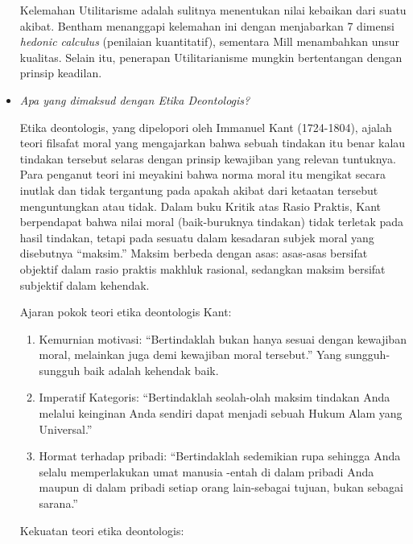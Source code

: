 \documentclass[10pt,a4paper]{article}
\def\tightlist{}
\begin{document}
\begin{multicols}{2}
\begin{itemize}
  Kelemahan Utilitarisme adalah sulitnya menentukan nilai kebaikan dari
  suatu akibat. Bentham menanggapi kelemahan ini dengan menjabarkan 7
  dimensi \emph{hedonic calculus} (penilaian kuantitatif), sementara
  Mill menambahkan unsur kualitas. Selain itu, penerapan Utilitarianisme
  mungkin bertentangan dengan prinsip keadilan.
\item
  \emph{Apa yang dimaksud dengan Etika Deontologis?}

  Etika deontologis, yang dipelopori oleh Immanuel Kant (1724-1804),
  ajalah teori filsafat moral yang mengajarkan bahwa sebuah tindakan itu
  benar kalau tindakan tersebut selaras dengan prinsip kewajiban yang
  relevan tuntuknya. Para penganut teori ini meyakini bahwa norma moral
  itu mengikat secara inutlak dan tidak tergantung pada apakah akibat
  dari ketaatan tersebut menguntungkan atau tidak. Dalam buku Kritik
  atas Rasio Praktis, Kant berpendapat bahwa nilai moral (baik-buruknya
  tindakan) tidak terletak pada hasil tindakan, tetapi pada sesuatu
  dalam kesadaran subjek moral yang disebutnya ``maksim.'' Maksim
  berbeda dengan asas: asas-asas bersifat objektif dalam rasio praktis
  makhluk rasional, sedangkan maksim bersifat subjektif dalam kehendak.

  Ajaran pokok teori etika deontologis Kant:

  \begin{enumerate}
  \def\labelenumi{\arabic{enumi}.}
  \tightlist
  \item
    Kemurnian motivasi: ``Bertindaklah bukan hanya sesuai dengan
    kewajiban moral, melainkan juga demi kewajiban moral tersebut.''
    Yang sungguh-sungguh baik adalah kehendak baik.
  \item
    Imperatif Kategoris: ``Bertindaklah seolah-olah maksim tindakan Anda
    melalui keinginan Anda sendiri dapat menjadi sebuah Hukum Alam yang
    Universal.''
  \item
    Hormat terhadap pribadi: ``Bertindaklah sedemikian rupa sehingga
    Anda selalu memperlakukan umat manusia -entah di dalam pribadi Anda
    maupun di dalam pribadi setiap orang lain-sebagai tujuan, bukan
    sebagai sarana.''
  \end{enumerate}

  Kekuatan teori etika deontologis:


\end{itemize}
\end{multicols}
\end{document}
